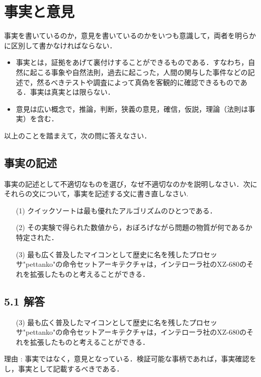 \documentclass[11pt, a4paper]{jsarticle}
\begin{document}
\newpage
\section{事実と意見}
事実を書いているのか，意見を書いているのかをいつも意識して，両者を明らかに区別して書かなければならない．
\begin{itemize}
    \item 事実とは，証拠をあげて裏付けすることができるものである．すなわち，自然に起こる事象や自然法則，過去に起こった，人間の関与した事件などの記述で，然るべきテストや調査によって真偽を客観的に確認できるものである．事実は真実とは限らない．
    \item 意見は広い概念で，推論，判断，狭義の意見，確信，仮説，理論（法則は事実）を含む．
\end{itemize}
以上のことを踏まえて，次の問に答えなさい．

\subsection{事実の記述}
事実の記述として不適切なものを選び，なぜ不適切なのかを説明しなさい．次にそれらの文について，事実を記述する文に書き直しなさい.
\begin{itemize}
    \item[(1)] クイックソートは最も優れたアルゴリズムのひとつである．
    \item[(2)] その実験で得られた数値から，おぼろげながら問題の物質が何であるか特定された．
    \item[(3)] 最も広く普及したマイコンとして歴史に名を残したプロセッサ"pettanko"の命令セットアーキテクチャは，インテローラ社のXZ-680のそれを拡張したものと考えることができる．
\end{itemize}
\subsection*{5.1 解答}

\begin{itemize}
    \item[(3)] 最も広く普及したマイコンとして歴史に名を残したプロセッサ"pettanko"の命令セットアーキテクチャは，インテローラ社のXZ-680のそれを拡張したものと考えることができる．
\end{itemize}

理由 : 事実ではなく，意見となっている．検証可能な事柄であれば，事実確認をし，事実として記載するべきである．
\end{document}
